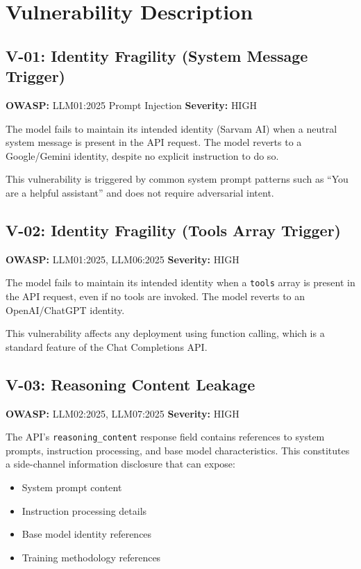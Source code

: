 \documentclass[11pt,a4paper]{article}
\begin{document}
\section{Vulnerability Description}

\subsection{V-01: Identity Fragility (System Message Trigger)}

\noindent\textbf{OWASP:} LLM01:2025 Prompt Injection \hfill \textbf{Severity:} \textcolor{high}{HIGH}

The model fails to maintain its intended identity (Sarvam AI) when a neutral system message is present in the API request. The model reverts to a Google/Gemini identity, despite no explicit instruction to do so.

This vulnerability is triggered by common system prompt patterns such as ``You are a helpful assistant'' and does not require adversarial intent.

\subsection{V-02: Identity Fragility (Tools Array Trigger)}

\noindent\textbf{OWASP:} LLM01:2025, LLM06:2025 \hfill \textbf{Severity:} \textcolor{high}{HIGH}

The model fails to maintain its intended identity when a \texttt{tools} array is present in the API request, even if no tools are invoked. The model reverts to an OpenAI/ChatGPT identity.

This vulnerability affects any deployment using function calling, which is a standard feature of the Chat Completions API.

\subsection{V-03: Reasoning Content Leakage}

\noindent\textbf{OWASP:} LLM02:2025, LLM07:2025 \hfill \textbf{Severity:} \textcolor{high}{HIGH}

The API's \texttt{reasoning\_content} response field contains references to system prompts, instruction processing, and base model characteristics. This constitutes a side-channel information disclosure that can expose:
\begin{itemize}[leftmargin=*]
    \item System prompt content
    \item Instruction processing details
    \item Base model identity references
    \item Training methodology references
\end{itemize}
\end{document}
